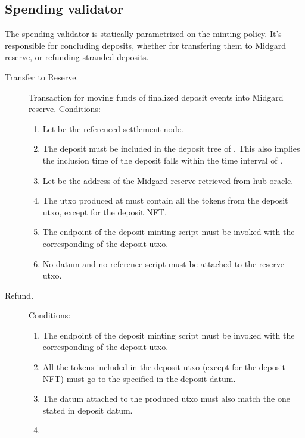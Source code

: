 \documentclass[../midgard.tex]{subfiles}
\begin{document}
\subsection{Spending validator}
\label{h:deposit-spending-validator}

The  spending validator is statically parametrized on the  minting policy.
It's responsible for concluding deposits, whether for transfering them to Midgard reserve, or refunding stranded deposits.

\begin{description}
  \item[Transfer to Reserve.] Transaction for moving funds of finalized deposit events into Midgard reserve.
    Conditions:
    \begin{enumerate}
      \item Let  be the referenced settlement node.
      \item The deposit must be included in the deposit tree of .
        This also implies the inclusion time of the deposit falls within the time interval of .
      \item Let  be the address of the Midgard reserve retrieved from hub oracle.
      \item The utxo produced at  must contain all the tokens from the deposit utxo, except for the deposit NFT.
      \item The  endpoint of the deposit minting script must be invoked with the corresponding  of the deposit utxo.
      \item No datum and no reference script must be attached to the reserve utxo.
    \end{enumerate}
  \item[Refund.] 
    Conditions:
    \begin{enumerate}
      \item The  endpoint of the deposit minting script must be invoked with the corresponding  of the deposit utxo.
      \item All the tokens included in the deposit utxo (except for the deposit NFT) must go to the  specified in the deposit datum.
      \item The datum attached to the produced utxo must also match the one stated in deposit datum.
      \item 
        \begin{itemize}

\end{itemize}
\end{enumerate}
\end{description}
\end{document}
